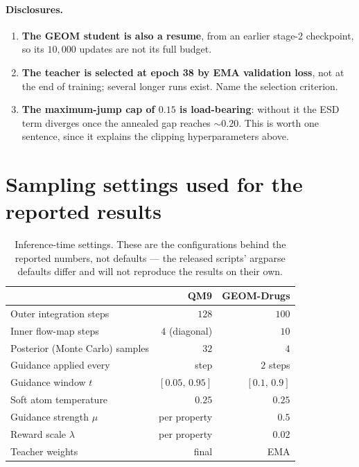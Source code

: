 \documentclass[11pt]{article}
\begin{document}
\paragraph{Disclosures.}
\begin{enumerate}
\item \textbf{The GEOM student is also a resume}, from an earlier stage-2
checkpoint, so its $10{,}000$ updates are not its full budget.
\item \textbf{The teacher is selected at epoch 38 by EMA validation loss}, not at
the end of training; several longer runs exist. Name the selection criterion.
\item \textbf{The maximum-jump cap of $0.15$ is load-bearing}: without it the ESD
term diverges once the annealed gap reaches ${\sim}0.20$. This is worth one
sentence, since it explains the clipping hyperparameters above.
\end{enumerate}

\section{Sampling settings used for the reported results}

\begin{table}[h]\centering
\caption{Inference-time settings. These are the configurations behind the
reported numbers, not defaults --- the released scripts' argparse defaults differ
and will not reproduce the results on their own.}
\label{tab:molecular-sampling}
\begin{tabular}{lrr}
\toprule
 & \textbf{QM9} & \textbf{GEOM-Drugs} \\
\midrule
Outer integration steps        & $128$ & $100$ \\
Inner flow-map steps           & $4$ (diagonal) & $10$ \\
Posterior (Monte Carlo) samples & $32$ & $4$ \\
Guidance applied every         & step & $2$ steps \\
Guidance window $t$            & $[0.05,\,0.95]$ & $[0.1,\,0.9]$ \\
Soft atom temperature          & $0.25$ & $0.25$ \\
Guidance strength $\mu$        & per property & $0.5$ \\
Reward scale $\lambda$         & per property & $0.02$ \\
Teacher weights                & final & EMA \\
\bottomrule
\end{tabular}
\end{table}
\end{document}
